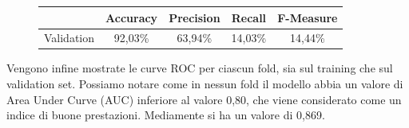 \begin{figure}[H]
	\centering
	\begin{tabular}{lcccc}
		\toprule
		& \textbf{Accuracy} & \textbf{Precision} & \textbf{Recall} & 
		\textbf{F-Measure}  \\
		\midrule
		Validation	&  92,03\%	& 63,94\%	& 14,03\% &	14,44\% \\
		\bottomrule
	\end{tabular}
	\label{tab:mlp_cv_performance}
\end{figure}

Vengono infine mostrate le curve ROC per ciascun fold, sia sul training che 
sul validation set. Possiamo notare come in nessun fold il modello abbia un 
valore di Area Under Curve (AUC) inferiore al valore 0,80, che viene 
considerato come un indice di buone prestazioni. Mediamente si ha un valore di 
0,869.

